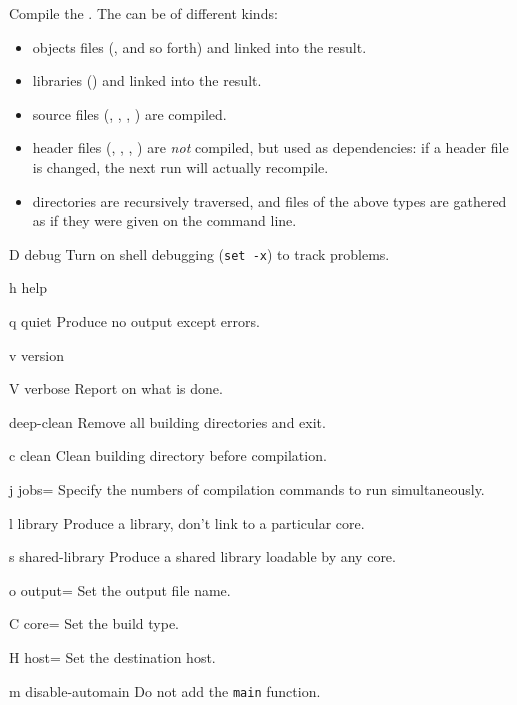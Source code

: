 Compile the .  The  can be of different kinds:
\begin{itemize}
\item objects files (,  and so forth) and linked
  into the result.
\item libraries () and linked into the result.
\item source files (, , , )
  are compiled.
\item header files (, , ,
  ) are \emph{not} compiled, but used as dependencies: if
  a header file is changed, the next  run will actually
  recompile.
\item directories are recursively traversed, and files of the above
  types are gathered as if they were given on the command line.
\end{itemize}

\begin{options}
\item[D]{debug} Turn on shell debugging (\lstinline|set -x|) to
  track  problems.
\item[h]{help} \optionHelp
\item[q]{quiet} Produce no output except errors.
\item[v]{version} \optionVersion
\item[V]{verbose} Report on what is done.
\end{options}

\begin{options}
\item{deep-clean} Remove all building directories and exit.
\item[c]{clean} Clean building directory before compilation.
\item[j]{jobs=} Specify the numbers of compilation
  commands to run simultaneously.
\item[l]{library} Produce a library, don't link to a particular
  core.
\item[s]{shared-library} Produce a shared library loadable by any
  core.
\item[o]{output=} Set the output file name.
\item[C]{core=} Set the build type.
\item[H]{host=} Set the destination host.
\item[m]{disable-automain} Do not add the \lstinline|main| function.
\end{options}


